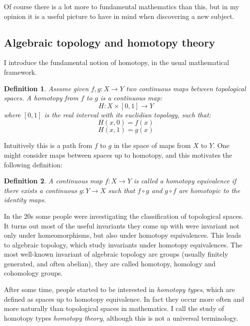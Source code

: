 \documentclass{article}
\newcommand{\sse}[1]{\medbreak \subsection{#1}}
\renewcommand{\r}{\rightarrow}
\newtheorem{definition}{Definition}
\begin{document}
Of course there is a lot more to fundamental mathematics than this, but in my opinion it is a useful picture to have in mind when discovering a new subject.


\sse{Algebraic topology and homotopy theory}

I introduce the fundamental notion of homotopy, in the usual mathematical framework.

\begin{definition}
Assume given $f,g:X\r Y$ two continuous maps between topological spaces. A homotopy from $f$ to $g$ is a continuous map:
\[H : X\times [0,1]\r Y\]
where $[0,1]$ is the real interval with its euclidian topology, such that:
\[H(x,0) = f(x)\]
\[H(x,1) = g(x)\]
\end{definition}

Intuitively this is a path from $f$ to $g$ in the space of maps from $X$ to $Y$. One might consider maps between spaces up to homotopy, and this motivates the following definition:

\begin{definition}
A continuous map $f:X\r Y$ is called a homotopy equivalence if there exists a continuous $g:Y\r X$ such that $f\circ g$ and $g\circ f$ are homotopic to the identity maps.
\end{definition}

In the 20s some people were investigating the classification of topological spaces. It turns out most of the useful invariants they come up with were invariant not only under homeomorphisms, but also under homotopy equivalences. This leads to algebraic topology, which study invariants under homotopy equivalences. The most well-known invariant of algebraic topology are groups (usually finitely generated, and often abelian), they are called homotopy, homology and cohomology groups.

After some time, people started to be interested in \emph{homotopy types}, which are defined as spaces up to homotopy equivalence. In fact they occur more often and more naturally than topological spaces in mathematics. %
 I call the study of homotopy types \emph{homotopy theory}, although this is not a universal terminology.
\end{document}
